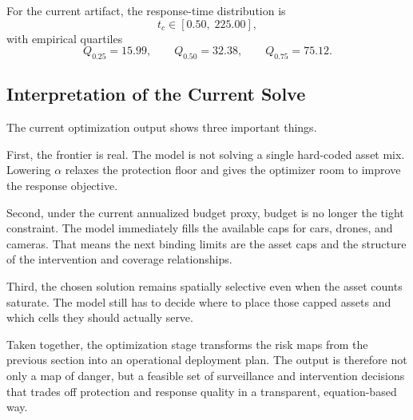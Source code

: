 For the current artifact, the response-time distribution is
\[
t_c \in
\left[
0.50,\;
225.00
\right],
\]
with empirical quartiles
\[
Q_{0.25} = 15.99,
\qquad
Q_{0.50} = 32.38,
\qquad
Q_{0.75} = 75.12.
\]

\subsection{Interpretation of the Current Solve}

The current optimization output shows three important things.

First, the frontier is real. The model is not solving a single hard-coded asset mix. Lowering $\alpha$ relaxes the protection floor and gives the optimizer room to improve the response objective.

Second, under the current annualized budget proxy, budget is no longer the tight constraint. The model immediately fills the available caps for cars, drones, and cameras. That means the next binding limits are the asset caps and the structure of the intervention and coverage relationships.

Third, the chosen solution remains spatially selective even when the asset counts saturate. The model still has to decide where to place those capped assets and which cells they should actually serve.

Taken together, the optimization stage transforms the risk maps from the previous section into an operational deployment plan. The output is therefore not only a map of danger, but a feasible set of surveillance and intervention decisions that trades off protection and response quality in a transparent, equation-based way.
